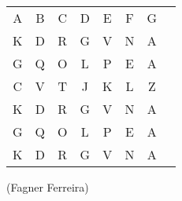 \begin{flushright}
    \begin{spacing}{1.0}
        \selectfont
        \begin{NiceTabularX}{\textwidth}{*{8}{c}}
            A & B & C & D & E & F & G \\
            K & D & R & G & V & N & A \\
            G & Q & O & L & P & E & A \\
            C & V & T & J & K & L & Z \\
            K & D & R & G & V & N & A \\
            G & Q & O & L & P & E & A \\
            K & D & R & G & V & N & A \\
        \end{NiceTabularX}
    \end{spacing}
    \vspace{1.5em}
    (Fagner Ferreira)
\end{flushright}
\pagebreak